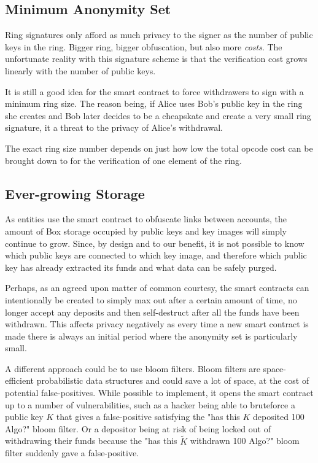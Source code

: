 \documentclass[9pt]{article}
\begin{document}
\subsection{Minimum Anonymity Set}

Ring signatures only afford as much privacy to the signer as the number of public keys in the ring. Bigger ring, bigger obfuscation, but also more \textit{costs}. The unfortunate reality with this signature scheme is that the verification cost grows linearly with the number of public keys.

It is still a good idea for the smart contract to force withdrawers to sign with a minimum ring size. The reason being, if Alice uses Bob's public key in the ring she creates and Bob later decides to be a cheapskate and create a very small ring signature, it a threat to the privacy of Alice's withdrawal.

The exact ring size number depends on just how low the total opcode cost can be brought down to for the verification of one element of the ring. 

\subsection{Ever-growing Storage}

As entities use the smart contract to obfuscate links between accounts, the amount of Box storage occupied by public keys and key images will simply continue to grow. Since, by design and to our benefit, it is not possible to know which public keys are connected to which key image, and therefore which public key has already extracted its funds and what data can be safely purged.

Perhaps, as an agreed upon matter of common courtesy, the smart contracts can intentionally be created to simply max out after a certain amount of time,  no longer accept any deposits and then self-destruct after all the funds have been withdrawn. This affects privacy negatively as every time a new smart contract is made there is always an initial period where the anonymity set is particularly small.

A different approach could be to use bloom filters. Bloom filters are space-efficient probabilistic data structures and could save a lot of space, at the cost of potential false-positives. While possible to implement, it opens the smart contract up to a number of vulnerabilities, such as a hacker being able to bruteforce a public key $K$ that gives a false-positive satisfying the "has this $K$ deposited 100 Algo?" bloom filter. Or a depositor being at risk of being locked out of withdrawing their funds because the "has this $\tilde{K}$ withdrawn 100 Algo?" bloom filter suddenly gave a false-positive.
\end{document}

